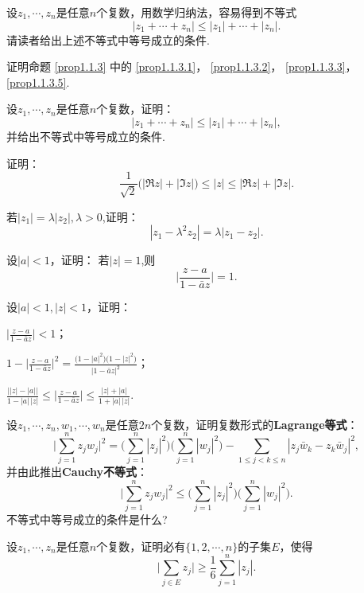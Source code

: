 设$z_1,\cdots,z_n$是任意$n$个复数，用数学归纳法，容易得到不等式
\[|z_1+\cdots+z_n|\le|z_1|+\cdots+|z_n|.\]
请读者给出上述不等式中等号成立的条件.

\begin{xiti}
\item 证明命题 \ref{prop1.1.3} 中的 \ref{prop1.1.3.1}， \ref{prop1.1.3.2}， \ref{prop1.1.3.3}， \ref{prop1.1.3.5}.
\item 设$z_1,\cdots,z_n$是任意$n$个复数，证明：
\[|z_1+\cdots+z_n|\le|z_1|+\cdots+|z_n|,\]
并给出不等式中等号成立的条件.
\item 证明：
\[\frac1{\sqrt2}\bigl(|\Re z|+|\Im z|\bigr)\le |z|\le|\Re z|+|\Im z|.\]
\item 若$|z_1|=\lambda|z_2|,\lambda>0$,证明：
\[|z_1-\lambda^2z_2|=\lambda|z_1-z_2|.\]
\item 设$|a|<1$，证明： 若$|z|=1$,则
\[\bigg|\frac{z-a}{1-\bar az}\bigg|=1.\]
\item 设$|a|<1,|z|<1$，证明：
\begin{enuma}
  \item $\bigg|\frac{z-a}{1-\bar az}\bigg|<1$；
  \item $1-\bigg|\frac{z-a}{1-\bar az}\bigg|^2=\frac{\bigl(1-|a|^2\bigr)\bigl(1-|z|^2\bigr)}{|1-\bar az|^2}$；
  \item $\frac{\bigl||z|-|a|\bigr|}{1-|a|\,|z|}\le\bigg|\frac{z-a}{1-\bar az}\bigg|\le
  \frac{|z|+|a|}{1+|a|\,|z|}$.
\end{enuma}
\item 设$z_1,\cdots,z_n,w_1,\cdots,w_n$是任意$2n$个复数，证明复数形式的\textbf{Lagrange等式}：
\[
\bigg| \sum_{j=1}^n{z_jw_j} \bigg|^2=\bigg( \sum_{j=1}^n{| z_j |^2} \bigg) \bigg( \sum_{j=1}^n{| w_j |^2} \bigg) -\sum_{1\leqslant j<k\leqslant n}{\left| z_j\bar{w}_k-z_k\bar{w}_j \right|^2},
\]
并由此推出\textbf{Cauchy不等式}：
\[
\bigg| \sum_{j=1}^n{z_jw_j} \bigg|^2\leqslant \bigg( \sum_{j=1}^n{| z_j |^2} \bigg) \bigg( \sum_{j=1}^n{| w_j |^2} \bigg).
\]
不等式中等号成立的条件是什么?
\item 设$z_1,\cdots,z_n$是任意$n$个复数，证明必有$\{1,2,\cdots,n\}$的子集$E$，使得
\[
\bigg| \sum_{j\in E}{z_j} \bigg|\geqslant \frac{1}{6}\sum_{j=1}^n{\left| z_j \right|}.
\]

\end{xiti}

